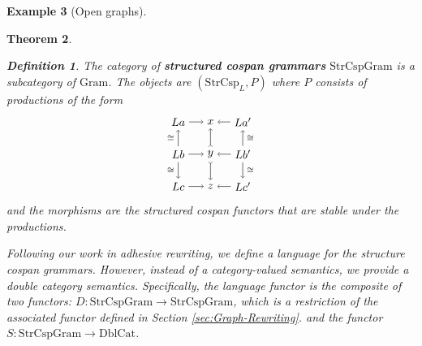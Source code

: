 \documentclass{amsart}
\newcommand{\iso}{\cong}
\newcommand{\DblCat}{\cat{DblCat}}
\newcommand{\Gram}{\cat{Gram}}
\newcommand{\StrCsp}{\cat{StrCsp}}
\newcommand{\StrCspGram}{\cat{StrCspGram}}
\newcommand{\Gram}{\cat{Gram}}
\newcommand{\defn}[1]{\textbf{#1}}
\newcommand{\cat}[1]{\mathrm{#1}}
\newcommand{\from}{\colon}
\newtheorem{theorem}{Theorem}[section]
\theoremstyle{remark}
\theoremstyle{definition}
\newtheorem{example}[theorem]{Example}
\newtheorem{definition}[theorem]{Definition}
\begin{document}
\begin{example}[Open graphs]
{{\begin{theorem}
\begin{definition} \label{def:linear-grammars}
  The category of \defn{structured cospan grammars} $ \StrCspGram $ is
  a subcategory of $ \Gram $.  The objects are $ ( \StrCsp_{L} , P ) $
  where $ P $ consists of productions of the form
  \[
    \begin{tikzpicture}
      \begin{scope}
        \node (1) at (0,2) {\( La \)};
        \node (2) at (1,2) {\( x \)};
        \node (3) at (2,2) {\( La' \)};
        \node (4) at (0,1) {\( Lb \)};
        \node (5) at (1,1) {\( y \)};
        \node (6) at (2,1) {\( Lb' \)};
        \node (7) at (0,0) {\( Lc \)};
        \node (8) at (1,0) {\( z \)};
        \node (9) at (2,0) {\( Lc' \)};
        \draw [->] (1) to node []
          {\scriptsize{\( \)}} (2);
        \draw [->] (3) to node []
          {\scriptsize{\( \)}} (2);
        \draw [->] (4) to node []
          {\scriptsize{\( \)}} (5);
        \draw [->] (6) to node []
          {\scriptsize{\( \)}} (5);
        \draw [->] (7) to node []
          {\scriptsize{\( \)}} (8);
        \draw [->] (9) to node []
          {\scriptsize{\( \)}} (8);
        \draw [->] (4) to node [left]
          {\scriptsize{\( \iso \)}} (1);
        \draw [->] (4) to node [left]
          {\scriptsize{\( \iso \)}} (7);
        \draw [>->] (5) to node []
          {\scriptsize{\( \)}} (2);
        \draw [>->] (5) to node []
          {\scriptsize{\( \)}} (8);
        \draw [->] (6) to node [right]
          {\scriptsize{\( \iso \)}} (3);
        \draw [->] (6) to node [right]
          {\scriptsize{\( \iso \)}} (9);
      \end{scope}
    \end{tikzpicture}
  \]
  and the morphisms are the structured cospan functors that are stable
  under the productions.
\end{definition}

Following our work in adhesive rewriting, we define a language for the
structure cospan grammars. However, instead of a category-valued
semantics, we provide a double category semantics. Specifically, the
language functor is the composite of two functors: $ D \from
\StrCspGram \to \StrCspGram $, which is a restriction of the associated
functor defined in Section \ref{sec:Graph-Rewriting}.
%
%
and the functor $ S \from \StrCspGram \to \DblCat $.


\end{theorem}}}
\end{example}
\end{document}
